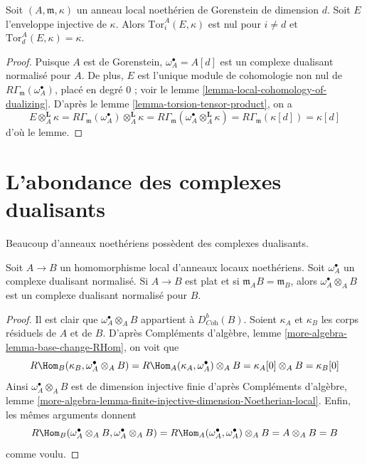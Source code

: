\begin{lemma}
\label{lemma-tor-injective-hull}
Soit $(A, \mathfrak m, \kappa)$ un anneau local noethérien de Gorenstein de dimension $d$.
Soit $E$ l'enveloppe injective de $\kappa$.
Alors $\text{Tor}_i^A(E, \kappa)$ est nul pour $i \not = d$ et $\text{Tor}_d^A(E, \kappa) = \kappa$.
\end{lemma}

\begin{proof}
Puisque $A$ est de Gorenstein, $\omega_A^\bullet = A[d]$ est un complexe dualisant normalisé pour $A$.
De plus, $E$ est l'unique module de cohomologie non nul de $R\Gamma_\mathfrak m(\omega_A^\bullet)$,
placé en degré $0$ ; voir le lemme \ref{lemma-local-cohomology-of-dualizing}.
D'après le lemme \ref{lemma-torsion-tensor-product}, on a
$$
E \otimes_A^\mathbf{L} \kappa =
R\Gamma_\mathfrak m(\omega_A^\bullet) \otimes_A^\mathbf{L} \kappa =
R\Gamma_\mathfrak m(\omega_A^\bullet \otimes_A^\mathbf{L} \kappa) =
R\Gamma_\mathfrak m(\kappa[d]) = \kappa[d]
$$
d'où le lemme.
\end{proof}




\section{L'abondance des complexes dualisants}
\label{section-ubiquity-dualizing}

\noindent
Beaucoup d'anneaux noethériens possèdent des complexes dualisants.

\begin{lemma}
\label{lemma-flat-unramified}
Soit $A \to B$ un homomorphisme local d'anneaux locaux noethériens.
Soit $\omega_A^\bullet$ un complexe dualisant normalisé.
Si $A \to B$ est plat et si $\mathfrak m_A B = \mathfrak m_B$,
alors $\omega_A^\bullet \otimes_A B$ est un complexe dualisant normalisé pour $B$.
\end{lemma}

\begin{proof}
Il est clair que $\omega_A^\bullet \otimes_A B$ appartient à $D^b_{\textit{Coh}}(B)$.
Soient $\kappa_A$ et $\kappa_B$ les corps résiduels de $A$ et de $B$.
D'après Compléments d'algèbre, lemme \ref{more-algebra-lemma-base-change-RHom}, on voit que
$$
R\Hom_B(\kappa_B, \omega_A^\bullet \otimes_A B) =
R\Hom_A(\kappa_A, \omega_A^\bullet) \otimes_A B =
\kappa_A[0] \otimes_A B = \kappa_B[0]
$$
Ainsi $\omega_A^\bullet \otimes_A B$ est de dimension injective finie d'après
Compléments d'algèbre, lemme \ref{more-algebra-lemma-finite-injective-dimension-Noetherian-local}.
Enfin, les mêmes arguments donnent
$$
R\Hom_B(\omega_A^\bullet \otimes_A B, \omega_A^\bullet \otimes_A B) =
R\Hom_A(\omega_A^\bullet, \omega_A^\bullet) \otimes_A B = A \otimes_A B = B
$$
comme voulu.
\end{proof}

